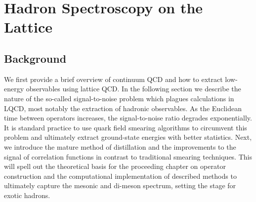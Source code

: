 
\chapter{Hadron Spectroscopy on the Lattice}
\label{sec:spec}
\section{Background}
We first provide a brief overview of continuum QCD and how to extract low-energy observables using lattice QCD. In the following section we describe the nature of the so-called signal-to-noise problem which plagues calculations in LQCD, most notably the extraction of hadronic observables. As the Euclidean time between operators increases, the signal-to-noise ratio degrades exponentially. It is standard practice to use quark field smearing algorithms to circumvent this problem and ultimately extract ground-state energies with better statistics. Next, we introduce the mature method of distillation \cite{peardon_novel_2009} and the improvements to the signal of correlation functions in contrast to traditional smearing techniques. This will spell out the theoretical basis for the proceeding chapter on operator construction and the computational implementation of described methods to ultimately capture the mesonic and di-meson spectrum, setting the stage for exotic hadrons. 

